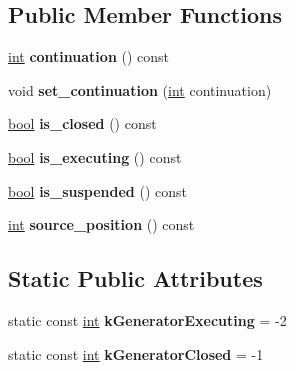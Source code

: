\subsection*{Public Member Functions}
\begin{DoxyCompactItemize}
\item 
\mbox{\label{classv8_1_1internal_1_1JSGeneratorObject_a42f420744b9a3ad872f4f8eab9b07a70}} 
\mbox{\hyperlink{classint}{int}} {\bfseries continuation} () const
\item 
\mbox{\label{classv8_1_1internal_1_1JSGeneratorObject_a5bb469af27f4edd8cfce380ac9fc8546}} 
void {\bfseries set\+\_\+continuation} (\mbox{\hyperlink{classint}{int}} continuation)
\item 
\mbox{\label{classv8_1_1internal_1_1JSGeneratorObject_aaa3ce743854de6a923834439b6c1ea03}} 
\mbox{\hyperlink{classbool}{bool}} {\bfseries is\+\_\+closed} () const
\item 
\mbox{\label{classv8_1_1internal_1_1JSGeneratorObject_a5082c9be962a28e7c8a1ea8a7744e5cb}} 
\mbox{\hyperlink{classbool}{bool}} {\bfseries is\+\_\+executing} () const
\item 
\mbox{\label{classv8_1_1internal_1_1JSGeneratorObject_a4da012c3e89635903d39c19721da2779}} 
\mbox{\hyperlink{classbool}{bool}} {\bfseries is\+\_\+suspended} () const
\item 
\mbox{\label{classv8_1_1internal_1_1JSGeneratorObject_a20178277ce0d26b2cf30c40c70f5edbe}} 
\mbox{\hyperlink{classint}{int}} {\bfseries source\+\_\+position} () const
\end{DoxyCompactItemize}
\subsection*{Static Public Attributes}
\begin{DoxyCompactItemize}
\item 
\mbox{\label{classv8_1_1internal_1_1JSGeneratorObject_a3b515123f771dc8d61065ded67f7f1f9}} 
static const \mbox{\hyperlink{classint}{int}} {\bfseries k\+Generator\+Executing} = -\/2
\item 
\mbox{\label{classv8_1_1internal_1_1JSGeneratorObject_a305bc269946a338f1232f4268392fa05}} 
static const \mbox{\hyperlink{classint}{int}} {\bfseries k\+Generator\+Closed} = -\/1
\end{DoxyCompactItemize}

